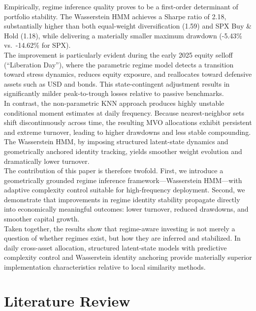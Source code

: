 \documentclass[11pt]{article}
\begin{document}
Empirically, regime inference quality proves to be a first-order determinant of portfolio stability. 
The Wasserstein HMM achieves a Sharpe ratio of 2.18, substantially higher than both equal-weight diversification (1.59) and SPX Buy \& Hold (1.18), while delivering a materially smaller maximum drawdown (-5.43\% vs.\ -14.62\% for SPX). \\
The improvement is particularly evident during the early 2025 equity selloff (``Liberation Day''), where the parametric regime model detects a transition toward stress dynamics, reduces equity exposure, and reallocates toward defensive assets such as USD and bonds. 
This state-contingent adjustment results in significantly milder peak-to-trough losses relative to passive benchmarks.\\
In contrast, the non-parametric KNN approach produces highly unstable conditional moment estimates at daily frequency. 
Because nearest-neighbor sets shift discontinuously across time, the resulting MVO allocations exhibit persistent and extreme turnover, leading to higher drawdowns and less stable compounding. 
The Wasserstein HMM, by imposing structured latent-state dynamics and geometrically anchored identity tracking, yields smoother weight evolution and dramatically lower turnover.\\
The contribution of this paper is therefore twofold. 
First, we introduce a geometrically grounded regime inference framework—Wasserstein HMM—with adaptive complexity control suitable for high-frequency deployment. 
Second, we demonstrate that improvements in regime identity stability propagate directly into economically meaningful outcomes: lower turnover, reduced drawdowns, and smoother capital growth.\\
Taken together, the results show that regime-aware investing is not merely a question of whether regimes exist, but how they are inferred and stabilized. 
In daily cross-asset allocation, structured latent-state models with predictive complexity control and Wasserstein identity anchoring provide materially superior implementation characteristics relative to local similarity methods.
\section{Literature Review}
\label{sec:literature}
\end{document}
